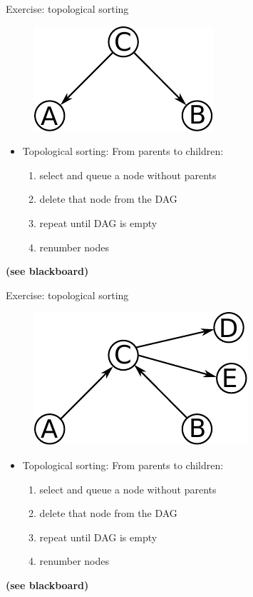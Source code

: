 \begin{frame}

Exercise: topological sorting

\begin{figure}[h]
	\centering
	\includegraphics[width=0.3\linewidth]{img/cond}%
    \label{fig:cond}%
\end{figure}

	\begin{itemize}
		\item Topological sorting: From parents to children:
			\begin{enumerate}
				\item select and queue a node without parents
				\item delete that node from the DAG
				\item repeat until DAG is empty
				\item renumber nodes
			\end{enumerate}
	\end{itemize}


\textbf{(see blackboard)}


\end{frame}


\begin{frame}

Exercise: topological sorting

\begin{figure}[h]
	\centering
	\includegraphics[width=0.3\linewidth]{img/dag1}%
    \label{fig:cond}%
\end{figure}

	\begin{itemize}
		\item Topological sorting: From parents to children:
			\begin{enumerate}
				\item select and queue a node without parents
				\item delete that node from the DAG
				\item repeat until DAG is empty
				\item renumber nodes
			\end{enumerate}
	\end{itemize}


\textbf{(see blackboard)}


\end{frame}

